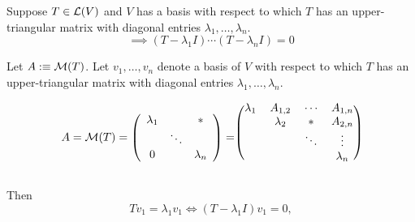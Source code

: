 \begin{thm}
  \label{thm: equation satisfied by operator with upper triangular matrix}
  Suppose $T\in \mathcal{L}(V)$ and $V$ has a basis with respect to which $T$ has an upper-triangular matrix with diagonal entries $\lambda_1, \dots, \lambda_n$.
  \begin{equation}
    \implies (T-\lambda_1I) \cdots (T-\lambda_nI)=0
  \end{equation}
\end{thm}
\begin{prf}
  Let $A :\equiv \mathcal{M}(T)$. Let $v_1, \ldots, v_n$ denote a basis of $V$ with respect to which $T$  has an upper-triangular matrix with diagonal entries $\lambda_1, \ldots, \lambda_n$.

  \begin{minipage}{\linewidth}
  \begin{equation}
    A = \mmatrix(T)
    =
    \left( {\begin{array}{ccc}
        \lambda_1 &         &  * \\
                  &  \ddots &    \\
        0         &         & \lambda_n
    \end{array} } \right)
    =
    \begin{blockarray}{(cccc)}
       \lambda_1&  A_{1,2}  &  \cdots &  A_{1,n} \\
                & \lambda_2 &     *   &  A_{2,n} \\
                &           &  \ddots &  \vdots  \\
                &           &         & \lambda_n
    \end{blockarray}
  \end{equation}
  \end{minipage}

  Then
  \begin{equation}
    \label{i-need-a-ref}
    T v_1 = \lambda_1 v_1 \iff (T-\lambda_1 I)  v_1 = 0,
  \end{equation}


\end{prf}

